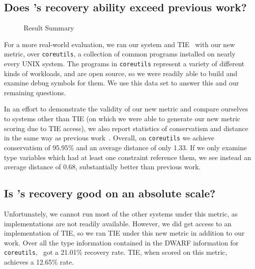 \subsection{Does \bitr's recovery ability exceed previous work?}
\label{subsec:evalprev}
\begin{figure}
\caption{Result Summary}
\label{fig:results}
\end{figure}
For a more real-world evaluation, we ran our system and TIE~\cite{tie} with our new metric, over \texttt{coreutils}, a collection of common programs installed on nearly every UNIX system. The programs in \texttt{coreutils} represent a variety of different kinds of workloads, and are open source, so we were readily able to build and examine debug symbols for them. We use this data set to answer this and our remaining questions.

In an effort to demonstrate the validity of our new metric and compare ourselves to systems other than TIE (on which we were able to generate our new metric scoring due to TIE access), we also report statistics of conservatism and distance in the same way as previous work~\cite{tie,sw}. Overall, on \texttt{coreutils} we achieve conservatism of 95.95\% and an average distance of only 1.33. If we only examine type variables which had at least one constraint reference them, we see instead an average distance of 0.68, substantially better than previous work.

\subsection{Is \bitr's recovery good on an absolute scale?}
Unfortunately, we cannot run most of the other systems under this metric, as implementations are not readily available. However, we did get access to an implementation of TIE, so we ran TIE under this new metric in addition to our work. Over all the type information contained in the DWARF information for \texttt{coreutils}, \bitr\ got a 21.01\% recovery rate. TIE, when scored on this metric, achieves a 12.65\% rate.

